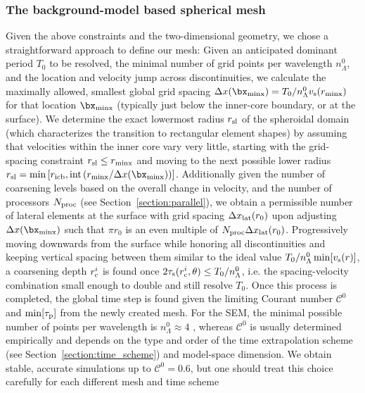 \subsubsection{The background-model based spherical mesh}
%
Given the above constraints and the two-dimensional geometry,
we chose a straightforward approach to define our mesh:
Given an anticipated dominant period $T_0$
to be resolved, the minimal number of grid points per wavelength $n^0_\Lambda$,
and the location and velocity jump across discontinuities,
we calculate the maximally allowed, smallest global grid spacing
$\Delta x(\bx_{\rm minx})=T_0/n^0_\Lambda v_{\rm s}(r_{\rm minx})$  for that location
$\bx_{\rm minx}$ (typically just below the inner-core boundary, or at the surface).
We determine the exact lowermost radius $r_{\rm sl}$ of the spheroidal domain
(which characterizes the transition to rectangular element shapes)
by assuming that velocities within the inner core vary very little, starting with
the grid-spacing constraint $r_{\rm sl}\le r_{\rm minx}$ and moving to
the next possible lower radius
$r_{\rm sl}=\min\left[r_{\rm icb},{\rm int}\left(r_{\rm minx}/\Delta x(\bx_{\rm minx})\right)\right]$.
Additionally given the number of coarsening levels based
on the overall change in velocity, and the number of processors $N_{\rm proc}$
(see Section~\ref{section:parallel}), we obtain a permissible number of lateral
elements at the surface with grid spacing $\Delta x_{\rm lat}(r_0)$
upon adjusting $\Delta x(\bx_{\rm minx})$ such that
$\pi r_0$ is an even multiple of $N_{\rm proc} \Delta x_{\rm lat}(r_0)$.
Progressively moving downwards from the surface while honoring all
discontinuities and keeping vertical spacing between them similar to
the ideal value $T_0/n^0_\Lambda \min[v_{\rm s}(r)]$, a coarsening depth
$\textstyle{r_{\rm c}^i}$ is
found once $\textstyle{2\tau_{\rm s}(r_{\rm c}^i,\theta)\le T_0/n^0_\Lambda}$,
i.e. the spacing-velocity combination small enough to double and still resolve $T_0$.
Once this process is completed, the global time step is found given the limiting
Courant number ${\mathcal C}^0$ and $\min[\tau_{\rm p}]$ from the newly
created mesh.
For the SEM, the minimal possible number of points per wavelength is
$n_\Lambda^0\approx4$ \citep[e.g.][]{Ampuero+:07}, whereas ${\mathcal C}^0$ is
usually determined empirically and depends on the type and
order of the time extrapolation scheme (see Section~\ref{section:time_scheme})
and model-space dimension.
We obtain stable, accurate simulations up to ${\mathcal C}^0=0.6$, but one should
treat this choice carefully for each different mesh and time scheme
